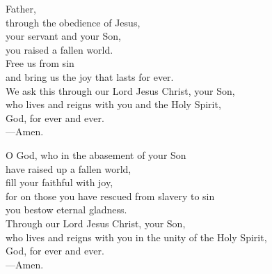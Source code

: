 \prayer


\begin{prayerverse}
Father,\\
through the obedience of Jesus,\\
your servant and your Son,\\
you raised a fallen world.\\
Free us from sin\\
and bring us the joy that lasts for ever.\\
We ask this through our Lord Jesus Christ, your Son,\\
who lives and reigns with you and the Holy Spirit,\\
God, for ever and ever.\\
{\color{red}---\thinspace}Amen.
\end{prayerverse}


\begin{prayerverse}
O God, who in the abasement of your Son\\
have raised up a fallen world,\\
fill your faithful with joy,\\
for on those you have rescued from slavery to sin\\
you bestow eternal gladness.\\
Through our Lord Jesus Christ, your Son,\\
who lives and reigns with you in the unity of the Holy Spirit,\\
God, for ever and ever.\\
{\color{red}---\thinspace}Amen.
\end{prayerverse}

